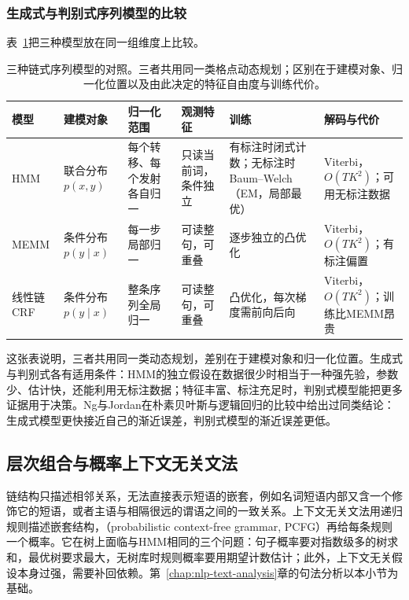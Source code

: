 \subsubsection{生成式与判别式序列模型的比较}
\label{sec:nlp-classical-sequence-comparison}

表~\ref{tab:nlp-classical-sequence-models}把三种模型放在同一组维度上比较。

\begin{table}[htbp]
  \begin{tabularx}{\linewidth}{@{}>{\raggedright\arraybackslash}p{17mm}>{\raggedright\arraybackslash}p{23mm}>{\raggedright\arraybackslash}p{28mm}>{\raggedright\arraybackslash}p{28mm}>{\raggedright\arraybackslash}p{30mm}>{\raggedright\arraybackslash}X@{}}
    \toprule
    模型 & 建模对象 & 归一化范围 & 观测特征 & 训练 & 解码与代价\\
    \midrule
    HMM & 联合分布$p(x,y)$ & 每个转移、每个发射各自归一 & 只读当前词，条件独立 & 有标注时闭式计数；无标注时Baum--Welch（EM，局部最优） & Viterbi，$O(TK^2)$；可用无标注数据\\
    MEMM & 条件分布$p(y\mid x)$ & 每一步局部归一 & 可读整句，可重叠 & 逐步独立的凸优化 & Viterbi，$O(TK^2)$；有标注偏置\\
    线性链CRF & 条件分布$p(y\mid x)$ & 整条序列全局归一 & 可读整句，可重叠 & 凸优化，每次梯度需前向后向 & Viterbi，$O(TK^2)$；训练比MEMM昂贵\\
    \bottomrule
  \end{tabularx}
  \caption{三种链式序列模型的对照。三者共用同一类格点动态规划；区别在于建模对象、归一化位置以及由此决定的特征自由度与训练代价。}
  \label{tab:nlp-classical-sequence-models}
\end{table}

这张表说明，三者共用同一类动态规划，差别在于建模对象和归一化位置。生成式与判别式各有适用条件：HMM的独立假设在数据很少时相当于一种强先验，参数少、估计快，还能利用无标注数据；特征丰富、标注充足时，判别式模型能把更多证据用于决策。Ng与Jordan在朴素贝叶斯与逻辑回归的比较中给出过同类结论：生成式模型更快接近自己的渐近误差，判别式模型的渐近误差更低。

\subsection{层次组合与概率上下文无关文法}
\label{sec:nlp-classical-pcfg}

链结构只描述相邻关系，无法直接表示短语的嵌套，例如名词短语内部又含一个修饰它的短语，或者主语与相隔很远的谓语之间的一致关系。上下文无关文法用递归规则描述嵌套结构，（probabilistic context-free grammar, PCFG）再给每条规则一个概率。它在树上面临与HMM相同的三个问题：句子概率要对指数级多的树求和，最优树要求最大，无树库时规则概率要用期望计数估计；此外，上下文无关假设本身过强，需要补回依赖。第~\ref{chap:nlp-text-analysis}章的句法分析以本小节为基础。

